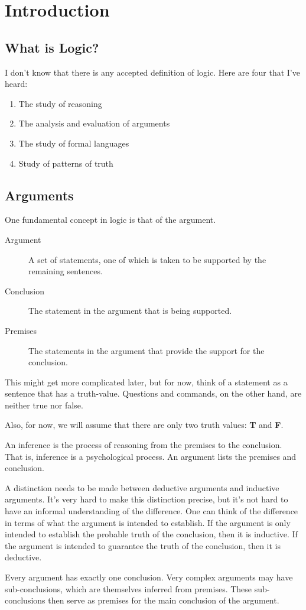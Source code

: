 \documentclass[../logic-text.tex]{subfiles}
\begin{document}
\chapter{Introduction}
\label{chap:intro}

\section{What is Logic?}
\label{sec:what-logic}

I don't know that there is any accepted definition of logic. Here are four that I've heard:

\begin{enumerate}
\item The study of reasoning
\item The analysis and evaluation of arguments
\item The study of formal languages
\item Study of patterns of truth
\end{enumerate}

\section{Arguments}
\label{sec:arguments}

One fundamental concept in logic is that of the argument.

\begin{description}
\item[Argument] A set of statements, one of which is taken to be supported by the remaining sentences.
\item[Conclusion] The statement in the argument that is being supported.
\item[Premises] The statements in the argument that provide the support for the conclusion.
\end{description}

This might get more complicated later, but for now, think of a statement as a sentence that has a truth-value. Questions and commands, on the other hand, are neither true nor false.

Also, for now, we will assume that there are only two truth values: \textbf{T} and \textbf{F}.

An inference is the process of reasoning from the premises to the conclusion. That is, inference is a psychological process. An argument lists the premises and conclusion.

A distinction needs to be made between deductive arguments and inductive arguments. It's very hard to make this distinction precise, but it's not hard to have an informal understanding of the difference. One can think of the difference in terms of what the argument is intended to establish. If the argument is only intended to establish the probable truth of the conclusion, then it is inductive. If the argument is intended to guarantee the truth of the conclusion, then it is deductive.

Every argument has exactly one conclusion. Very complex arguments may have sub-conclusions, which are themselves inferred from premises. These sub-conclusions then serve as premises for the main conclusion of the argument.
\end{document}
